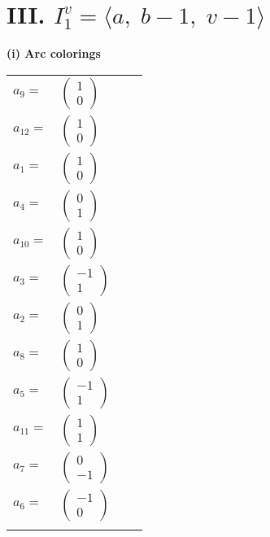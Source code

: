 \documentclass[1p]{elsarticle_modified}
\theoremstyle{definition}
\begin{document}
\centering \section*{III. $I^v_{1}= \langle a,\;b-1,\;v-1 \rangle$}
\flushleft \textbf{(i) Arc colorings}\\
\begin{tabular}{m{7pt} m{180pt} m{7pt} m{180pt} }
\flushright $a_{9}=$&$\begin{pmatrix}1\\0\end{pmatrix}$ \\
\flushright $a_{12}=$&$\begin{pmatrix}1\\0\end{pmatrix}$ \\
\flushright $a_{1}=$&$\begin{pmatrix}1\\0\end{pmatrix}$ \\
\flushright $a_{4}=$&$\begin{pmatrix}0\\1\end{pmatrix}$ \\
\flushright $a_{10}=$&$\begin{pmatrix}1\\0\end{pmatrix}$ \\
\flushright $a_{3}=$&$\begin{pmatrix}-1\\1\end{pmatrix}$ \\
\flushright $a_{2}=$&$\begin{pmatrix}0\\1\end{pmatrix}$ \\
\flushright $a_{8}=$&$\begin{pmatrix}1\\0\end{pmatrix}$ \\
\flushright $a_{5}=$&$\begin{pmatrix}-1\\1\end{pmatrix}$ \\
\flushright $a_{11}=$&$\begin{pmatrix}1\\1\end{pmatrix}$ \\
\flushright $a_{7}=$&$\begin{pmatrix}0\\-1\end{pmatrix}$ \\
\flushright $a_{6}=$&$\begin{pmatrix}-1\\0\end{pmatrix}$\\&\end{tabular}
\end{document}
